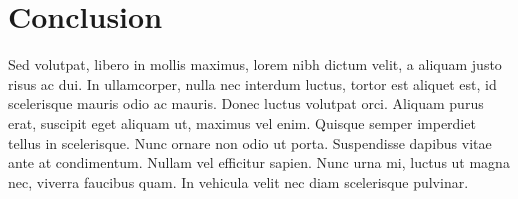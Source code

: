 \section{Conclusion}
Sed volutpat, libero in mollis maximus, lorem nibh dictum velit, a aliquam justo risus ac dui. In ullamcorper, nulla nec interdum luctus, tortor est aliquet est, id scelerisque mauris odio ac mauris. Donec luctus volutpat orci. Aliquam purus erat, suscipit eget aliquam ut, maximus vel enim. Quisque semper imperdiet tellus in scelerisque. Nunc ornare non odio ut porta. Suspendisse dapibus vitae ante at condimentum. Nullam vel efficitur sapien. Nunc urna mi, luctus ut magna nec, viverra faucibus quam. In vehicula velit nec diam scelerisque pulvinar.

